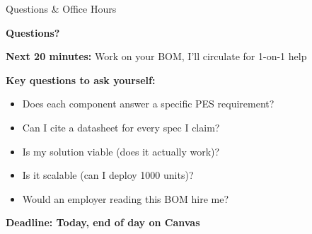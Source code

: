 \documentclass[aspectratio=169,11pt]{beamer}
\begin{document}
\begin{frame}{Questions \& Office Hours}
    \begin{center}
        \Large \textbf{Questions?}
        
        \vspace{0.5cm}
        \normalsize
        \textbf{Next 20 minutes:} Work on your BOM, I'll circulate for 1-on-1 help
        
        \vspace{0.3cm}
        \textbf{Key questions to ask yourself:}
        \begin{itemize}
            \item Does each component answer a specific PES requirement?
            \item Can I cite a datasheet for every spec I claim?
            \item Is my solution viable (does it actually work)?
            \item Is it scalable (can I deploy 1000 units)?
            \item Would an employer reading this BOM hire me?
        \end{itemize}
        
        \vspace{0.5cm}
        \textbf{Deadline: Today, end of day on Canvas}
    \end{center}
\end{frame}
\end{document}
